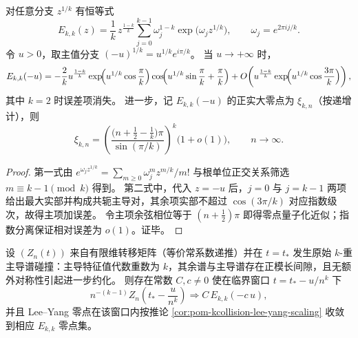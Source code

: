 \begin{theorem}\label{thm:pom-kcollision-ekk-root-phase-quantization}
对任意分支 \(z^{1/k}\) 有恒等式
\[
E_{k,k}(z)=\frac1k\,z^{\frac{1-k}{k}}\sum_{j=0}^{k-1}\omega_j^{1-k}\exp\!\bigl(\omega_j z^{1/k}\bigr),\qquad
\omega_j=e^{2\pi i j/k}.
\]
令 \(u>0\)，取主值分支 \((-u)^{1/k}=u^{1/k}e^{i\pi/k}\)。
当 \(u\to+\infty\) 时，
\[
E_{k,k}(-u)
=-\frac{2}{k}u^{\frac{1-k}{k}}
\exp\!\Bigl(u^{1/k}\cos\frac{\pi}{k}\Bigr)
\cos\!\Bigl(u^{1/k}\sin\frac{\pi}{k}+\frac{\pi}{k}\Bigr)
+O\!\left(u^{\frac{1-k}{k}}\exp\!\Bigl(u^{1/k}\cos\frac{3\pi}{k}\Bigr)\right),
\]
其中 \(k=2\) 时误差项消失。
进一步，记 \(E_{k,k}(-u)\) 的正实大零点为 \(\xi_{k,n}\)（按递增计），则
\[
\xi_{k,n}
=\left(\frac{\bigl(n+\frac12-\frac1k\bigr)\pi}{\sin(\pi/k)}\right)^{k}\bigl(1+o(1)\bigr),\qquad n\to\infty.
\]
\end{theorem}
\begin{proof}
第一式由
\(
e^{\omega_j z^{1/k}}=\sum_{m\ge 0}\omega_j^m z^{m/k}/m!
\)
与根单位正交关系筛选 \(m\equiv k-1\pmod k\) 得到。
第二式中，代入 \(z=-u\) 后，\(j=0\) 与 \(j=k-1\) 两项给出最大实部并构成共轭主导对，其余项实部不超过 \(\cos(3\pi/k)\) 对应指数级次，故得主项加误差。
令主项余弦相位等于 \((n+\frac12)\pi\) 即得零点量子化近似；指数分离保证相对误差为 \(o(1)\)。证毕。
\end{proof}

\begin{conjecture}[有限维转移模型中的重碰撞临界核普适性]\label{conj:pom-kcollision-universality-ekk}
设 \((Z_n(t))\) 来自有限维转移矩阵（等价常系数递推）并在 \(t=t_\ast\) 发生原始 \(k\)-重主导谱碰撞：主导特征值代数重数为 \(k\)，其余谱与主导谱存在正模长间隙，且无额外对称性引起进一步约化。
则存在常数 \(C,c\ne 0\) 使在临界窗口 \(t=t_\ast-u/n^k\) 下
\[
n^{-(k-1)}Z_n\!\left(t_\ast-\frac{u}{n^k}\right)\Longrightarrow C\,E_{k,k}(-c\,u),
\]
并且 Lee--Yang 零点在该窗口内按推论 \ref{cor:pom-kcollision-lee-yang-scaling} 收敛到相应 \(E_{k,k}\) 零点集。
\end{conjecture}
